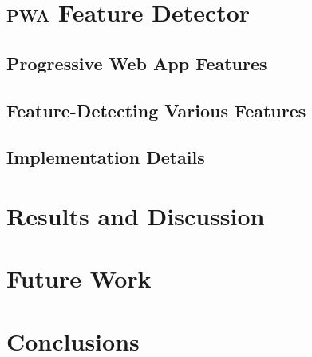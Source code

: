 \documentclass[sigconf]{acmart}
\begin{document}
\section{\textsc{pwa} Feature Detector}
\label{sec:pwa-feature-detector}

\subsection{Progressive Web App Features}

\subsection{Feature-Detecting Various Features}

\subsection{Implementation Details}

\section{Results and Discussion}
\label{sec:results-and-discussion}

\section{Future Work}
\label{sec:future-work}

\section{Conclusions}
\label{sec:conclusions}




\end{document}

